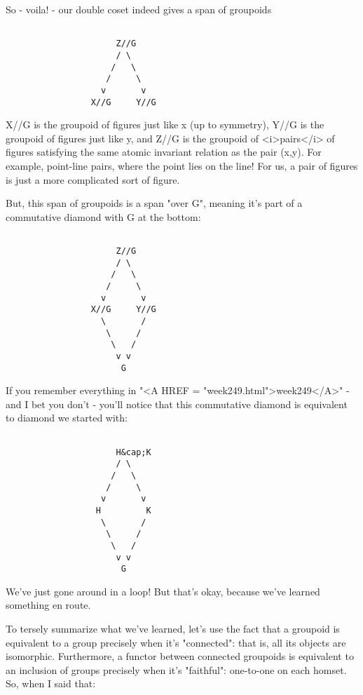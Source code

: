 So - voila! - our double coset indeed gives a span of groupoids


\begin{verbatim}

                      Z//G
                      / \
                     /   \
                    /     \
                   v       v
                 X//G     Y//G
\end{verbatim}
    

X//G is the groupoid of figures just like x (up to symmetry), Y//G
is the groupoid of figures just like y, and Z//G is the groupoid of 
<i>pairs</i> of figures satisfying the same atomic invariant relation
as the pair (x,y).  For example, point-line pairs, where the point
lies on the line!  For us, a pair of figures is just a more complicated
sort of figure.

But, this span of groupoids is a span "over G", meaning it's
part of a commutative diamond with G at the bottom:


\begin{verbatim}

                      Z//G
                      / \
                     /   \
                    /     \
                   v       v
                 X//G     Y//G
                   \       /
                    \     /
                     \   /
                      v v
                       G
\end{verbatim}
    

If you remember everything in "<A HREF =
"week249.html">week249</A>" - and I bet you don't - you'll notice
that this commutative diamond is equivalent to diamond we started
with:


\begin{verbatim}

                      H&cap;K
                      / \
                     /   \
                    /     \
                   v       v
                  H         K
                   \       /
                    \     /
                     \   /
                      v v
                       G
\end{verbatim}
    
We've just gone around in a loop!  But that's okay, because we've
learned something en route.

To tersely summarize what we've learned, let's use the fact that a 
groupoid is equivalent to a group precisely when it's "connected":
that is, all its objects are isomorphic.  Furthermore, a functor between 
connected groupoids is equivalent to an inclusion of groups precisely 
when it's "faithful": one-to-one on each homset.  So, when I said that:

